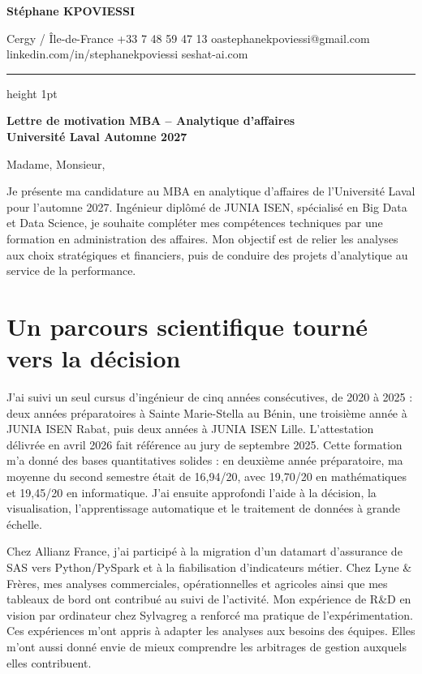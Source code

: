 \documentclass[12pt,a4paper]{article}
\begin{document}
\thispagestyle{empty}

{\LARGE\bfseries Stéphane KPOVIESSI}\par
\vspace{0.25em}
{\footnotesize\color{muted}Cergy / Île-de-France \textbullet{} +33 7 48 59 47 13 \textbullet{} oastephanekpoviessi@gmail.com\\
linkedin.com/in/stephanekpoviessi \textbullet{} seshat-ai.com}\par
\vspace{0.25em}
{\color{rule}\hrule height 1pt}
\vspace{0.3em}

{\bfseries Lettre de motivation \textbullet{} MBA -- Analytique d'affaires\\
Université Laval \textbullet{} Automne 2027}\par
\vspace{0.5em}

Madame, Monsieur,

Je présente ma candidature au MBA en analytique d'affaires de l'Université Laval pour l'automne 2027. Ingénieur diplômé de JUNIA ISEN, spécialisé en Big Data et Data Science, je souhaite compléter mes compétences techniques par une formation en administration des affaires. Mon objectif est de relier les analyses aux choix stratégiques et financiers, puis de conduire des projets d'analytique au service de la performance.

\section{Un parcours scientifique tourné vers la décision}

J'ai suivi un seul cursus d'ingénieur de cinq années consécutives, de 2020 à 2025 : deux années préparatoires à Sainte Marie-Stella au Bénin, une troisième année à JUNIA ISEN Rabat, puis deux années à JUNIA ISEN Lille. L'attestation délivrée en avril 2026 fait référence au jury de septembre 2025. Cette formation m'a donné des bases quantitatives solides : en deuxième année préparatoire, ma moyenne du second semestre était de 16,94/20, avec 19,70/20 en mathématiques et 19,45/20 en informatique. J'ai ensuite approfondi l'aide à la décision, la visualisation, l'apprentissage automatique et le traitement de données à grande échelle.

Chez Allianz France, j'ai participé à la migration d'un datamart d'assurance de SAS vers Python/PySpark et à la fiabilisation d'indicateurs métier. Chez Lyne \& Frères, mes analyses commerciales, opérationnelles et agricoles ainsi que mes tableaux de bord ont contribué au suivi de l'activité. Mon expérience de R\&D en vision par ordinateur chez Sylvagreg a renforcé ma pratique de l'expérimentation. Ces expériences m'ont appris à adapter les analyses aux besoins des équipes. Elles m'ont aussi donné envie de mieux comprendre les arbitrages de gestion auxquels elles contribuent.
\end{document}
